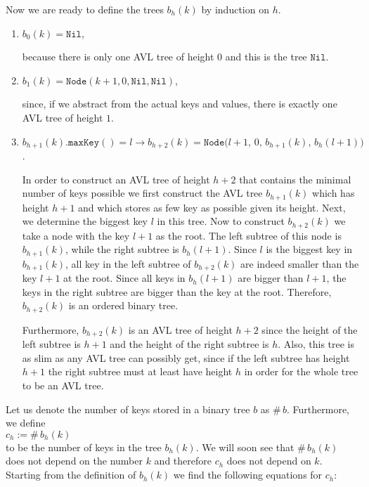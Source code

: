 Now we are ready to define the trees  $b_h(k)$ by induction on  $h$.
\begin{enumerate}
\item $b_0(k) = \texttt{Nil}$,

      because there is only one AVL tree of height $0$ and this is the tree $\texttt{Nil}$.
\item $b_1(k) = \texttt{Node}(k+1,0,\texttt{Nil}, \texttt{Nil})$,

      since, if we abstract from the actual keys and values, there is exactly one AVL tree of height
      $1$.
\item $b_{h+1}(k).\texttt{maxKey}() = l \rightarrow 
       b_{h+2}(k) = \texttt{Node}\bigl(l+1,\,0,\,b_{h+1}(k),\,b_h(l+1)\bigr)$.

      In order to construct an AVL tree of height $h+2$ that contains the minimal number of keys 
      possible we first construct the AVL tree $b_{h+1}(k)$ which has height  $h+1$ and which stores as few
      key as possible given its height.  Next, we determine the biggest key $l$ in this tree. 
      Now to construct $b_{h+2}(k)$ we take a node with the key $l+1$ as the root.
      The left subtree of this node is $b_{h+1}(k)$, while the right subtree is $b_h(l+1)$.
      Since $l$ is the biggest key in $b_{h+1}(k)$, all key in the left subtree of
      $b_{h+2}(k)$ are indeed smaller than the key $l+1$ at the root.  Since all keys in
      $b_h(l+1)$ are bigger than $l+1$, the keys in the right subtree are bigger than the key at the
      root.  Therefore, $b_{h+2}(k)$ is an ordered binary tree.

      Furthermore, $b_{h+2}(k)$ is an AVL tree of height $h+2$ since the height of the left subtree
      is $h+1$ and the height of the right subtree is $h$.  Also, this tree is as slim as
      any AVL tree can possibly get, since if the left subtree has height $h+1$ the right subtree
      must at least have height $h$ in order for the whole tree to be an AVL tree.
\end{enumerate}
Let us denote the number of keys stored in a binary tree $b$ as  $\#\,b$.  Furthermore, we define
\\[0.2cm]
\hspace*{1.3cm}
$c_h := \#\, b_h(k)$
\\[0.2cm]
to be the number of keys in the tree $b_h(k)$.  We will soon see that 
$\#\,b_h(k)$ does not depend on the number $k$ and therefore $c_h$ does not depend on $k$.  Starting
from the definition of $b_h(k)$ we find the following equations for $c_h$:
